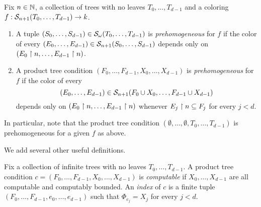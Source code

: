 \begin{definition}
	Fix $n\in\mathbb{N}$,  a collection of trees with no leaves $T_0, \dots, T_{d-1}$ and a coloring $f: \mathcal{S}_{n+1}({T_0, \dots, T_{d-1}}) \to k$.
	\begin{enumerate}
		\item A tuple $(S_0, \dots, S_{d-1}) \in \mathcal{S}_{\omega}({T_0, \dots, T_{d-1}})$ is \emph{prehomogeneous} for $f$ if the color of every $(E_0, \dots, E_{d-1}) \in \mathcal{S}_{n+1}({S_0, \dots, S_{d-1}})$ depends only on $(E_0 \upharpoonright n, \dots, E_{d-1} \upharpoonright n)$.
		\item A product tree condition $(F_0, \dots, F_{d-1}, X_0, \dots,X_{d-1})$ is \emph{prehomogeneous} for $f$  if the color of every
		\[
		(E_0, \dots, E_{d-1}) \in \mathcal{S}_{n+1}({F_0 \cup X_0, \dots, F_{d-1} \cup X_{d-1}})
		\]
		depends only on $( E_0 \upharpoonright n, \dots, E_{d-1} \upharpoonright n )$ whenever $E_j \upharpoonright n \subseteq F_j$ for every $j < d$.
	\end{enumerate}
\end{definition}


\noindent In particular, note that the product tree condition $(\emptyset, \dots, \emptyset, T_0, \dots,T_{d-1})$ is prehomogeneous for a given $f$ as above.

We add several other useful definitions.

\begin{definition}
	Fix a collection of infinite trees with no leaves $T_0, \dots, T_{d-1}$. A product tree condition $c = (F_0, \dots, F_{d-1}, X_0, \dots,X_{d-1})$ is \emph{computable} if $X_0, \dots, X_{d-1}$ are all computable and computably bounded. An \emph{index} of $c$ is a finite tuple  $(F_0, \dots, F_{d-1}, e_0, \dots,e_{d-1})$ such that $\Phi_{e_j} = X_j$ for every $j < d$.
\end{definition}

